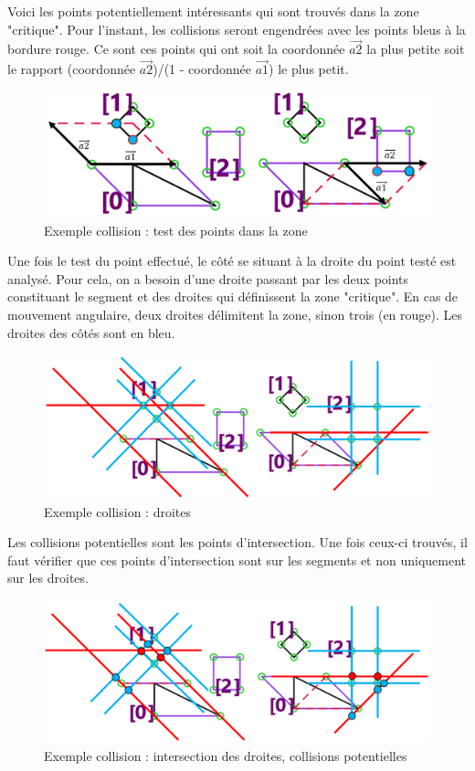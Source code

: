 \documentclass[a4paper, 12pt]{article}
\begin{document}
Voici les points potentiellement intéressants qui sont trouvés dans la zone "critique". Pour l'instant, les collisions seront engendrées avec les points bleus à la bordure rouge. Ce sont ces points qui ont soit la coordonnée $\vec{a2}$ la plus petite soit le rapport (coordonnée $\vec{a2}$)/(1 - coordonnée $\vec{a1}$) le plus petit.
\begin{figure}[h!]
\centering
\includegraphics[width=0.7\linewidth]{includes/images/collisions/5_pointCheck}
\caption{Exemple collision : test des points dans la zone}
\label{fig:5pointcheck}
\end{figure}
Une fois le test du point effectué, le côté se situant à la droite du point testé est analysé. Pour cela, on a besoin d'une droite passant par les deux points constituant le segment et des droites qui définissent la zone "critique". En cas de mouvement angulaire, deux droites délimitent la zone, sinon trois (en rouge). Les droites des côtés sont en bleu. 
\begin{figure}[h!]
\centering
\includegraphics[width=0.7\linewidth]{includes/images/collisions/6_lines}
\caption{Exemple collision : droites}
\label{fig:6lines}
\end{figure}
Les collisions potentielles sont les points d'intersection. Une fois ceux-ci trouvés, il faut vérifier que ces points d'intersection sont sur les segments et non uniquement sur les droites.
\begin{figure}[h!]
\centering
\includegraphics[width=0.7\linewidth]{includes/images/collisions/7_linesIntersections}
\caption{Exemple collision : intersection des droites, collisions potentielles}
\label{fig:7linesintersections}
\end{figure}
\end{document}
